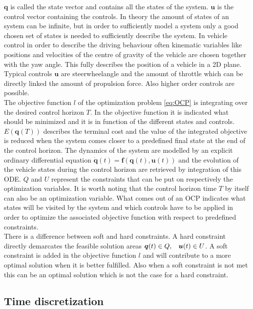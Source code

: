 $\bm{q}$ is called the state vector and contains all the states of the system. $\bm{u}$ is the control vector containing the controls. In theory the amount of states of an system can be infinite, but in order to sufficiently model a system only a good chosen set of states is needed to sufficiently describe the system. In vehicle control in order to describe the driving behaviour often kinematic variables like positions and velocities of the centre of gravity of the vehicle are chosen together with the yaw angle. This fully describes the position of a vehicle in a 2D plane. Typical controls $\bm{u}$ are steerwheelangle and the amount of throttle which can be directly linked the amount of propulsion force. Also higher order controls are possible.\\
The objective function $l$ of the optimization problem \ref{eq:OCP} is integrating over the desired control horizon $T$. In the objective function it is indicated what should be minimized and it is in function of the different states and controls. $E(\bm{q}(T))$ describes the terminal cost and the value of the integrated objective is reduced when the system comes closer to a predefined final state at the end of the control horizon.
The dynamics of the system are modelled by an explicit ordinary differential equation $\bm{\dot{q}}(t) = \bm{f}(\bm{q}(t), \bm{u}(t))$ and the evolution of the vehicle states during the control horizon are retrieved by integration of this ODE.
$Q$ and $U$ represent the constraints that can be put on respectively the optimization variables. It is worth noting that the control horizon time $T$ by itself can also be an optimization variable. What comes out of an OCP indicates what states will be visited by the system and which controls have to be applied in order to optimize the associated objective function with respect to predefined constraints. \cite{Panos_opti}\\ 

There is a difference between soft and hard constraints. A hard constraint directly demarcates the feasible solution areas $\bm{q}(t)\in Q,\hspace{3 mm} \bm{u}(t)\in U$. A soft constraint is added in the objective function $l$ and will contribute to a more optimal solution when it is better fulfilled. Also when a soft constraint is not met this can be an optimal solution which is not the case for a hard constraint. \cite{Yankov} \\

\subsection{Time discretization}\label{s:time_dis}

